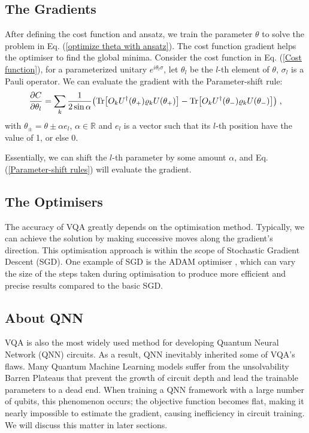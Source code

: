 \subsection{The Gradients}
After defining the cost function and ansatz, we train the parameter $\theta$ to solve the problem in Eq. (\ref{optimize theta with ansatz}).
The cost function gradient helps the optimiser to find the global minima. 
Consider the cost function in Eq. (\ref{Cost function}), for a parameterized unitary $e^{i \theta_l \sigma}$, let $\theta_l$ be the $l$-th element of $\theta$, $\sigma_l$ is a Pauli operator. 
We can evaluate the gradient with the Parameter-shift rule:
\begin{equation}
    \frac{\partial C}{\partial\theta_l}
    = \sum_k \frac{1}{2 \sin{\alpha}} 
    \left( 
        \Tr[O_k U^\dagger(\theta_+) \rho_k U(\theta_+)] 
        - \Tr[O_k U^\dagger(\theta_-) \rho_k U(\theta_-)]
    \right) \;,
    \label{Parameter-shift rules}
\end{equation}
with $\theta_{\pm} = \theta \pm \alpha e_l$, $\alpha \in \mathbb{R}$ and $e_l$ is a vector such that its $l$-th position have the value of 1, or else 0.

Essentially, we can shift the $l$-th parameter by some amount $\alpha$, and Eq. (\ref{Parameter-shift rules}) will evaluate the gradient. 


\subsection{The Optimisers}
The accuracy of VQA greatly depends on the optimisation method.
Typically, we can achieve the solution by making successive moves along the gradient's direction.
This optimisation approach is within the scope of Stochastic Gradient Descent (SGD).
One example of SGD is the ADAM optimiser \cite{kingmaAdamMethodStochastic2014}, which can vary the size of the steps taken during optimisation to produce more efficient and precise results compared to the basic SGD.


\subsection{About QNN}
VQA is also the most widely used method for developing Quantum Neural Network (QNN) circuits. 
As a result, QNN inevitably inherited some of VQA's flaws.
Many Quantum Machine Learning models suffer from the unsolvability Barren Plateaus \cite{zhaoReviewQuantumNeural2021} that prevent the growth of circuit depth and lead the trainable parameters to a dead end.
When training a QNN framework with a large number of qubits, this phenomenon occurs; the objective function becomes flat, making it nearly impossible to estimate the gradient, \cite{mccleanBarrenPlateausQuantum2018, zhaoAnalyzingBarrenPlateau2021} causing inefficiency in circuit training. We will discuss this matter in later sections.

